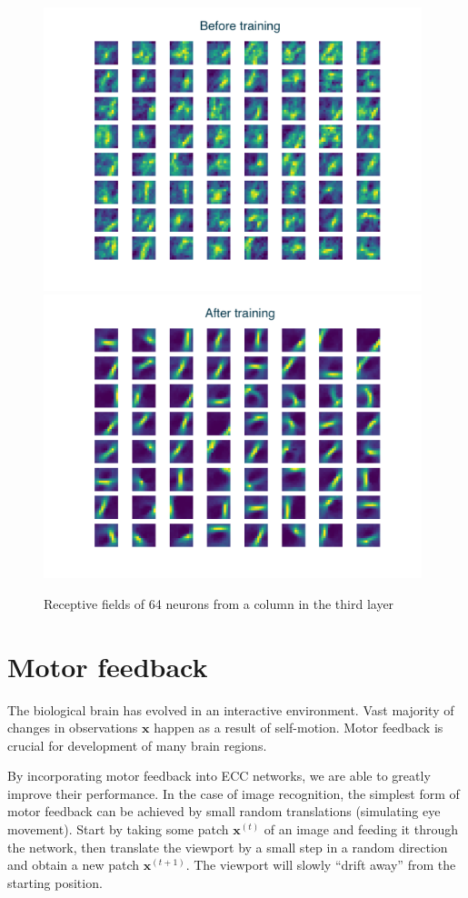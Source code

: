 \documentclass[12pt]{article}
\begin{document}
\begin{figure}[!htbp]
	\centering
	\includegraphics[width=11cm]{k5s2c1d1_k2s1c20d1_k3s1c49d1_c64 machine before}
	\includegraphics[width=11cm]{k5s2c1d1_k2s1c20d1_k3s1c49d1_c64 machine after}
	\caption{Receptive fields of 64 neurons from a column in the third layer}
	\label{fig:layer3}
\end{figure} 

\section{Motor feedback}

The biological brain has evolved in an interactive environment. Vast majority of changes in observations $\boldsymbol{x}$ happen as a result of self-motion. Motor feedback is crucial for development of many brain regions. 

By incorporating motor feedback into ECC networks, we are able to greatly improve their performance. In the case of image recognition, the simplest form of motor feedback can be achieved by small random translations (simulating eye movement). Start by taking some patch $\boldsymbol{x}^{(t)}$ of an image and feeding it through the network, then translate the viewport by a small step in a random direction and obtain a new patch $\boldsymbol{x}^{(t+1)}$. The viewport will slowly ``drift away'' from the starting position.
\end{document}
